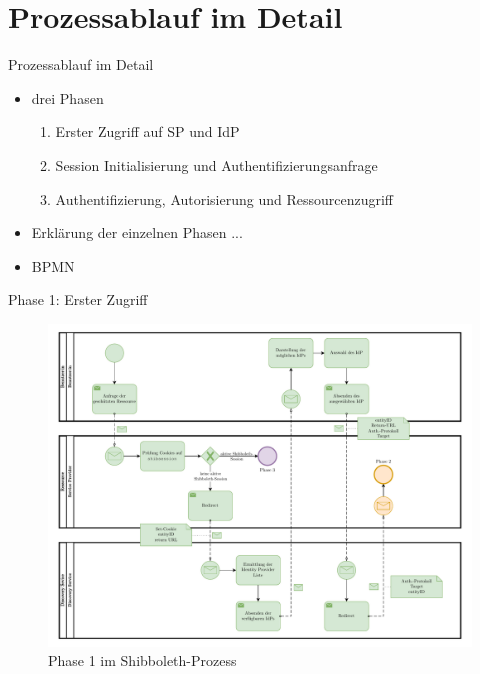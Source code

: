 
\section{Prozessablauf im Detail}

\begin{frame}{Prozessablauf im Detail}
    \begin{itemize}
        \item drei Phasen
        \begin{enumerate}
            \item Erster Zugriff auf SP und IdP
            \item Session Initialisierung und Authentifizierungsanfrage
            \item Authentifizierung, Autorisierung und Ressourcenzugriff~\cite{switchExpertDemoSWITCHaai2024a, shibbolethFlowsAndConfigShibbolethConcepts2019}
        \end{enumerate}
        \item Erklärung der einzelnen Phasen ...
        \item BPMN
    \end{itemize}
\end{frame}


\begin{frame}{Phase 1: Erster Zugriff}

    \begin{figure}
        \includegraphics[height=0.7\paperheight]{../assets/bis_bpmn_phase_1.drawio.pdf}
        \caption{Phase 1 im Shibboleth-Prozess~\cite[vgl.][]{switchExpertDemoSWITCHaai2024a}}
    \end{figure}
\end{frame}


